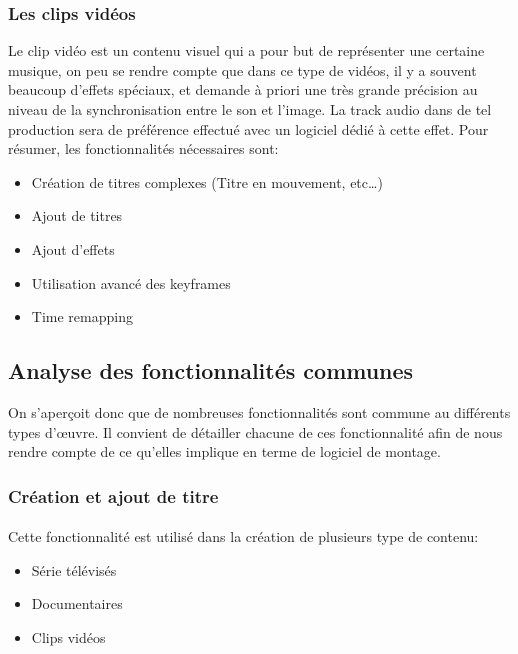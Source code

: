     \subsubsection {Les clips vidéos}
      Le clip vidéo est un contenu visuel qui a pour but de représenter
      une certaine musique, on peu se rendre compte que dans ce type de
      vidéos, il y a souvent beaucoup d'effets spéciaux, et demande à
      priori une très grande précision au niveau de la synchronisation
      entre le son et l'image. La track audio dans de tel production
      sera de préférence effectué avec un logiciel dédié à cette
      effet. Pour résumer, les fonctionnalités nécessaires sont:
      \begin{itemize}
        \item{Création de titres complexes (Titre en mouvement, etc\ldots)}
        \item{Ajout de titres}
        \item{Ajout d'effets}
        \item{Utilisation avancé des keyframes}
        \item{Time remapping}
      \end{itemize}

  \subsection{Analyse des fonctionnalités communes}
    On s'aperçoit donc que de nombreuses fonctionnalités sont commune au différents
    types d'œuvre. Il convient de détailler chacune de ces fonctionnalité afin de
    nous rendre compte de ce qu'elles implique en terme de logiciel de montage.

    \subsubsection{Création et ajout de titre}
      \paragraph{}
        Cette fonctionnalité est utilisé dans la création de plusieurs type de contenu:
      \begin{itemize}
        \item {Série télévisés}
        \item {Documentaires}
        \item {Clips vidéos}
      \end{itemize}
